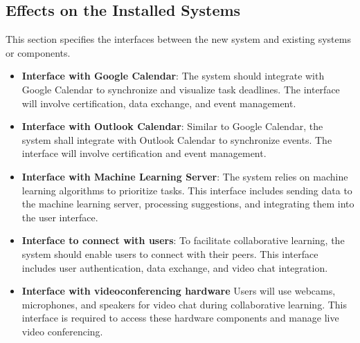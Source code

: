 \documentclass[12pt]{article}
\begin{document}
\subsection{Effects on the Installed Systems}
This section specifies the interfaces between the new system and existing systems or components.
\begin{itemize}
    \item \textbf{Interface with Google Calendar}: The system should integrate with Google Calendar to synchronize and visualize task deadlines. The interface will involve certification, data exchange, and event management.
    
    \item \textbf{Interface with Outlook Calendar}: Similar to Google Calendar, the system shall integrate with Outlook Calendar to synchronize events. The interface will involve certification and event management.

    \item \textbf{Interface with Machine Learning Server}: The system relies on machine learning algorithms to prioritize tasks. This interface includes sending data to the machine learning server, processing suggestions, and integrating them into the user interface.

    \item \textbf{Interface to connect with users}: To facilitate collaborative learning, the system should enable users to connect with their peers. This interface includes user authentication, data exchange, and video chat integration.

    \item \textbf{Interface with videoconferencing hardware} Users will use webcams, microphones, and speakers for video chat during collaborative learning. This interface is required to access these hardware components and manage live video conferencing.
\end{itemize}
\end{document}
